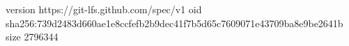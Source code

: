 version https://git-lfs.github.com/spec/v1
oid sha256:739d2483d660ae1e8ccfefb2b9dec41f7b5d65c7609071e43709ba8e9be2641b
size 2796344
